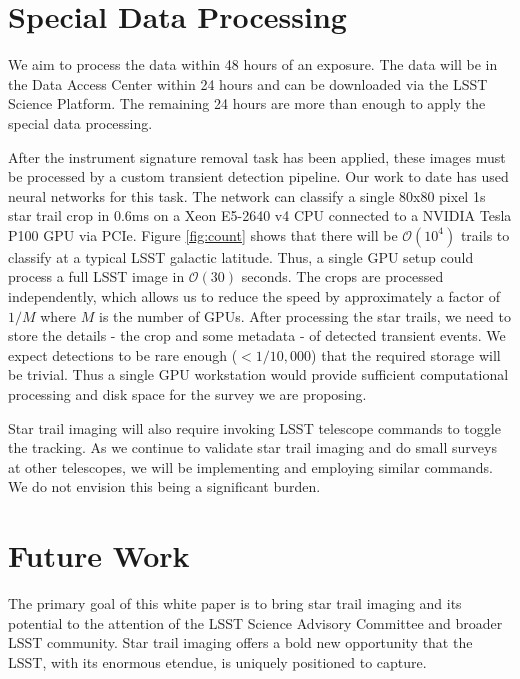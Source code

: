 \documentclass[12pt, letterpaper]{article}
\begin{document}
\vspace{.6in}

\section{Special Data Processing}

We aim to process the data within 48 hours of an exposure. The data will be in the Data Access Center within 24 hours and can be downloaded via the LSST Science Platform. The remaining 24 hours are more than enough to apply the special data processing.

After the instrument signature removal task has been applied, these images must be processed by a custom transient detection pipeline. Our work to date has used neural networks for this task. The network can classify a single 80x80 pixel 1s star trail crop in 0.6ms on a Xeon E5-2640 v4 CPU connected to a NVIDIA Tesla P100 GPU via PCIe. Figure \ref{fig:count} shows that there will be $\mathcal{O}(10^4)$ trails to classify at a typical LSST galactic latitude. Thus, a single GPU setup could process a full LSST image in $\mathcal{O}(30)$ seconds. The crops are processed independently, which allows us to reduce the speed by approximately a factor of $1/M$ where $M$ is the number of GPUs.  After processing the star trails, we need to store the details - the crop and some metadata - of detected transient events. We expect detections to be rare enough ($< 1/10,000$) that the required storage will be trivial. Thus a single GPU workstation would provide sufficient computational processing and disk space for the survey we are proposing.

Star trail imaging will also require invoking LSST telescope commands to toggle the tracking. As we continue to validate star trail imaging and do small surveys at other telescopes, we will be implementing and employing similar commands. We do not envision this being a significant burden.

\section{Future Work}
\label{sec:future}

The primary goal of this white paper is to bring star trail imaging and its potential to the attention of the LSST Science Advisory Committee and broader LSST community. Star trail imaging offers a bold new opportunity that the LSST, with its enormous etendue, is uniquely positioned to capture. 
\end{document}
